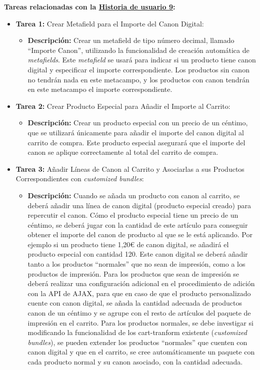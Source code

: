 \documentclass[12pt]{article}
\begin{document}
\textbf{Tareas relacionadas con la \hyperref[sec:historia9]{Historia de usuario 9}:}
\begin{itemize}
    \item \textbf{Tarea 1:} Crear Metafield para el Importe del Canon Digital:
          \begin{itemize}[label=--]
              \item \textbf{Descripción:} Crear un metafield de tipo número decimal, llamado ``Importe Canon'', utilizando la funcionalidad de creación automática de \textit{metafields}. Este \textit{metafield} se usará para indicar si un producto tiene canon digital y especificar el importe correspondiente. Los productos sin canon no tendrán nada en este metacampo, y los productos con canon tendrán en este metacampo el importe correspondiente.
          \end{itemize}
    \item \textbf{Tarea 2:} Crear Producto Especial para Añadir el Importe al Carrito:
          \begin{itemize}[label=--]
              \item \textbf{Descripción:} Crear un producto especial con un precio de un céntimo, que se utilizará únicamente para añadir el importe del canon digital al carrito de compra. Este producto especial asegurará que el importe del canon se aplique correctamente al total del carrito de compra.
          \end{itemize}
    \item \textbf{Tarea 3:} Añadir Líneas de Canon al Carrito y Asociarlas a sus Productos Correspondientes con \textit{customized bundles}:
          \begin{itemize}[label=--]
              \item \textbf{Descripción:} Cuando se añada un producto con canon al carrito, se deberá añadir una línea de canon digital (producto especial creado) para repercutir el canon.
              Cómo el producto especial tiene un precio de un céntimo, se deberá jugar con la cantidad de este artículo para conseguir obtener el importe del canon de producto al que se le está aplicando. Por ejemplo
              si un producto tiene 1,20€ de canon digital, se añadirá el producto especial con cantidad 120.
              Este canon digital se deberá añadir tanto a los productos ``normales'' que no sean de impresión, como a los productos de impresión.
              Para los productos que sean de impresión se deberá realizar una configuración adicional en el procedimiento de adición con la API de AJAX, para que en caso de que el producto personalizado cuente con canon digital, se añada la cantidad adecuada de productos canon de un céntimo y se agrupe con el resto de artículos del paquete de impresión en el carrito.
              Para los productos normales, se debe investigar si modificando la funcionalidad de los cart-tranform existente (\textit{customized bundles}), se pueden extender los productos ``normales'' que cuenten con canon digital y que en el carrito, se cree automáticamente un paquete con cada producto normal y su canon asociado, con la cantidad adecuada.
          \end{itemize}
\end{itemize}
\end{document}
